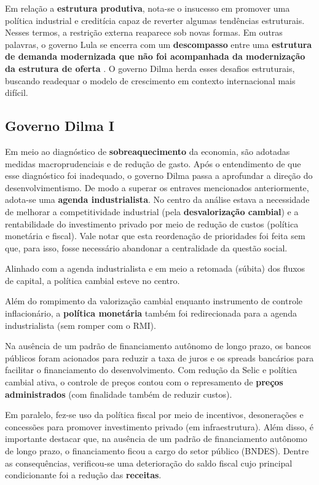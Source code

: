 \documentclass[11pt]{article}
\begin{document}
Em relação a \textbf{estrutura produtiva}, nota-se o insucesso em promover uma política industrial e creditícia capaz de reverter algumas tendências estruturais.
Nesses termos, a restrição externa reaparece sob novas formas.
Em outras palavras, o governo Lula se encerra com um \textbf{descompasso} entre uma \textbf{estrutura de demanda modernizada que não foi acompanhada da modernização da estrutura de oferta} \cite{melloIndustrialismoAusteridadePolitica}.
O governo Dilma herda esses desafios estruturais, buscando readequar o modelo de
crescimento em contexto internacional mais difícil.

\subsection*{Governo Dilma I}
\label{sec:org30bb77f}

Em meio ao diagnóstico de \textbf{sobreaquecimento} da economia, são adotadas medidas macroprudenciais e de redução de gasto.
Após o entendimento de que esse diagnóstico foi inadequado, o governo Dilma passa a
aprofundar a direção do desenvolvimentismo.
De modo a superar os entraves mencionados anteriormente, adota-se uma \textbf{agenda industrialista}.
No centro da análise estava a necessidade de melhorar a competitividade industrial (pela \textbf{desvalorização cambial}) e a rentabilidade do investimento privado por meio de redução de custos (política monetária e fiscal).
Vale notar que esta reordenação de prioridades foi feita sem que, para isso, fosse necessário abandonar a centralidade da questão social.

Alinhado com a agenda industrialista e em meio a retomada (súbita) dos fluxos de capital, a política cambial esteve no centro.

Além do rompimento da valorização cambial enquanto instrumento de controle inflacionário, a \textbf{política monetária} também foi redirecionada para a agenda industrialista (sem romper com o RMI).

Na ausência de um padrão de financiamento autônomo de longo prazo, os bancos públicos foram acionados para reduzir a taxa de juros e os spreads bancários para facilitar o financiamento do desenvolvimento.
Com redução da Selic e política cambial ativa, o controle de preços contou com o
represamento de \textbf{preços administrados} (com finalidade também de reduzir custos).


Em paralelo, fez-se uso da política fiscal por meio de incentivos, desonerações e concessões para promover investimento privado (em infraestrutura).
Além disso, é importante destacar que, na ausência de um padrão de financiamento autônomo de longo prazo, o financiamento ficou a cargo do setor público (BNDES).
Dentre as consequências, verificou-se uma deterioração do saldo fiscal cujo principal condicionante foi a redução das \textbf{receitas}.
\end{document}
